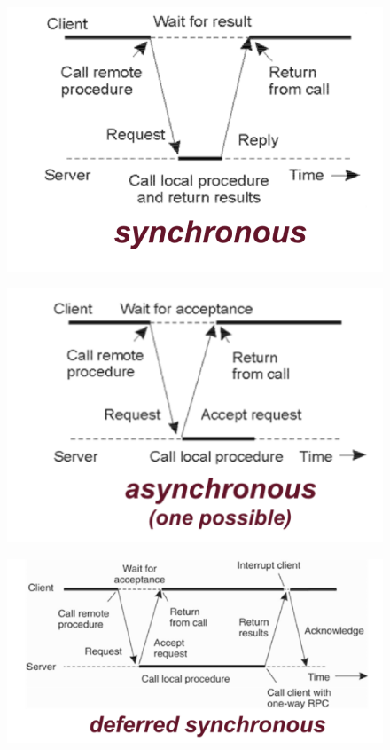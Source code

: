 \documentclass[10pt,a4paper]{article}
\begin{document}
\begin{figure}[h!]
\centering
\begin{minipage}{.3\textwidth}
  \includegraphics[width=.9\linewidth]{images/sync.png}
  \label{fig:sync}
\end{minipage}%
\begin{minipage}{.3\textwidth}
  \includegraphics[width=.9\linewidth]{images/async.png}
  \label{fig:async}
\end{minipage}%
\begin{minipage}{.3\textwidth}
  \includegraphics[width=.9\linewidth]{images/def-sync.png}
  \label{fig:def-sync}
\end{minipage}
\end{figure} 
\end{document}
